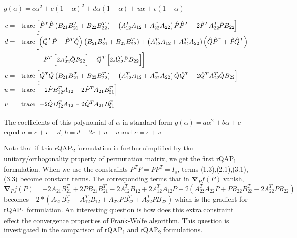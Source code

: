\documentclass[12pt,oneside,final]{thesis}\usepackage[]{graphicx}\usepackage[]{color}
\begin{document}
$g\left(\alpha\right)=c\alpha^{2}+e(1-\alpha)^{2}+d\alpha(1-\alpha)+u\alpha+v(1-\alpha)$


\begin{align*}
c & = &\textup{trace}&\left[\hat{P}^{T}\hat{P}\left(B_{21}B_{21}^{T}+B_{22}B_{22}^{T}\right)+\left(A_{12}^{T}A_{12}+A_{22}^{T}A_{22}\right)\hat{P}\hat{P}^{T}-2\hat{P}^{T}A_{22}^{T}\hat{P}B_{22}\right]
\\
d & = & \textup{trace}& \biggl[\left(\hat{Q}^{T}\hat{P}+\hat{P}^{T}\hat{Q}\right)\left(B_{21}B_{21}^{T}+B_{22}B_{22}^{T}\right)+\left(A_{12}^{T}A_{12}+A_{22}^{T}A_{22}\right)\left(\hat{Q}\hat{P}^{T}+\hat{P}\hat{Q}^{T}\right) \\
 &  &  & -\hat{P}^{T}\left[2 A_{22}^{T}\hat{Q}B_{22}\right]-\hat{Q}^{T}\left[ 2 A_{22}^{T}\hat{P}B_{22}\right]\biggr] \\
e & =& \textup{trace} & \left[\hat{Q}^{T}\hat{Q}\left(B_{21}B_{21}^{T}+B_{22}B_{22}^{T}\right)+\left(A_{12}^{T}A_{12}+A_{22}^{T}A_{22}\right)\hat{Q}\hat{Q}^{T}-2\hat{Q}^{T}A_{22}^{T}\hat{Q}B_{22}\right]
\\ u & = & \textup{trace} &\left[-2\hat{P}B_{12}^{T}A_{12}-2\hat{P}^{T}A_{21}B_{21}^{T}\right]
\\ v & = & \textup{trace} &\left[-2\hat{Q}B_{12}^{T}A_{12}-2\hat{Q}^{T}A_{21}B_{21}^{T}\right]
\end{align*}

The coefficients of this  polynomial of $\alpha$ in standard form $g(\alpha)= a{\alpha}^2+b\alpha+c$ equal $a=c+e-d$,
$b=d-2e+u-v$ and $c=e+v$ .

Note that if this rQAP\textsubscript{2} formulation is further simplified  by the unitary/orthogonality property of permutation  matrix, we get the first rQAP\textsubscript{1} formulation. When we use the constraints $P^TP=PP^T=I_{s}$, terms (1.3),(2.1),(3.1),(3.3) become constant terms. The corresponding  terms that in $\boldsymbol{\nabla}_{P}f(P)$ vanish,
$\boldsymbol{\nabla}_{P}f(P)=-2A_{21}B_{21}^{T}+2PB_{21}B_{21}^{T}-2A_{12}^{T}B_{12}+2A_{12}^{T}A_{12}P+2(A_{22}^{T}A_{22}P+PB_{22}B_{22}^{T}-2A_{22}^{T}PB_{22})$
becomes $-2*(A_{21}B_{21}^T+A_{12}^TB_{12}+A_{22}PB_{22}^T+A_{22}^TPB_{22})$ which is the gradient for rQAP\textsubscript{1} formulation.
An interesting question is how does this extra constraint effect the convergence properties of Frank-Wolfe algorithm.  This question is investigated in the comparison of rQAP\textsubscript{1} and rQAP\textsubscript{2} formulations.  
\end{document}
